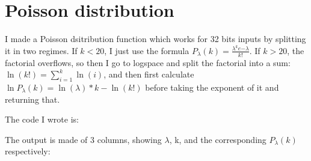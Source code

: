 \section{Poisson distribution}

I made a Poisson dsitribution function which works for 32 bits inputs by splitting it in two regimes.
If $k < 20$, I just use the formula $P_\lambda(k) = \frac{\lambda^k e{-\lambda}}{k!}$.
If $k > 20$, the factorial overflows, so then I go to logspace and split the factorial into a sum: 
$\ln(k!) = \sum_{i=1}^{k} \ln(i)$, and then first calculate $\ln P_\lambda(k) = \ln(\lambda) * k - \ln(k!)$ before taking the exponent of it and returning that. 

The code I wrote is:


The output is made of 3 columns, showing $\lambda$, k, and the corresponding $P_\lambda(k)$ respectively:

